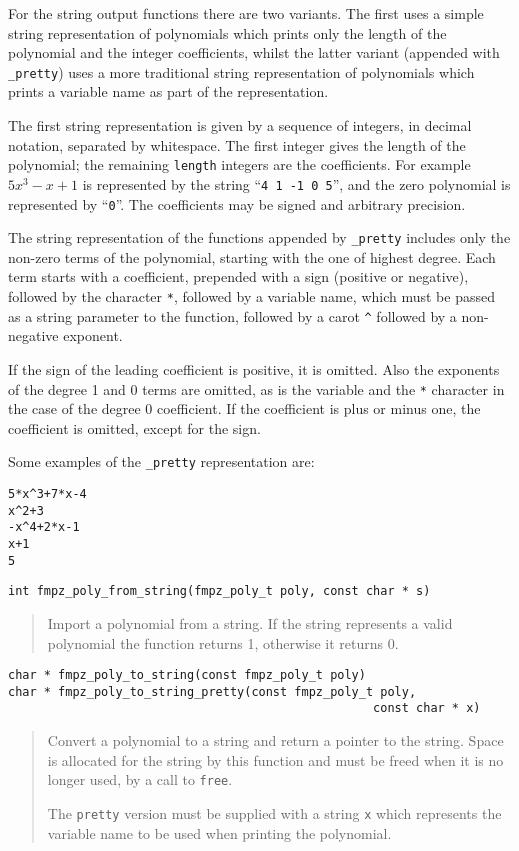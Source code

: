 \documentclass[a4paper,10pt]{article}
\newcommand{\code}{\lstinline}
\begin{document}
For the string output functions there are two variants. The first uses a simple string representation of polynomials which prints only the length of the polynomial and the integer coefficients, whilst the latter variant (appended with \code{_pretty}) uses a more traditional string representation of polynomials which prints a variable name as part of the representation. 

The first string representation is given by a sequence of integers, in decimal notation, separated by whitespace. The first integer gives the length of the polynomial; the remaining \code{length} integers are the coefficients. For example $5x^3 - x + 1$ is represented by the string ``\code{4 1 -1 0 5}'', and the zero polynomial is represented by ``\code{0}''. The coefficients may be signed and arbitrary precision.

The string representation of the functions appended by \code{_pretty} includes only the non-zero terms of the polynomial, starting with the one of highest degree. Each term starts with a coefficient, prepended with a sign (positive or negative), followed by the character \code{*}, followed by a variable name, which must be passed as a string parameter to the function, followed by a carot \code{^} followed by a non-negative exponent.

If the sign of the leading coefficient is positive, it is omitted. Also the exponents of the degree 1 and 0 terms are omitted, as is the variable and the \code{*} character in the case of the degree 0 coefficient. If the coefficient is plus or minus one, the coefficient is omitted, except for the sign.

Some examples of the \code{_pretty} representation are:

\begin{lstlisting}
5*x^3+7*x-4
x^2+3
-x^4+2*x-1
x+1
5
\end{lstlisting}

\begin{lstlisting}
int fmpz_poly_from_string(fmpz_poly_t poly, const char * s)
\end{lstlisting}
\begin{quote}
Import a polynomial from a string. If the string represents a valid polynomial the function returns 1, otherwise it returns 0.
\end{quote}

\begin{lstlisting}
char * fmpz_poly_to_string(const fmpz_poly_t poly)
char * fmpz_poly_to_string_pretty(const fmpz_poly_t poly, 
                                                   const char * x)
\end{lstlisting}
\begin{quote}
Convert a polynomial to a string and return a pointer to the string. Space is allocated for the string by this function and must be freed when it is no longer used, by a call to \code{free}.

The \code{pretty} version must be supplied with a string \code{x} which represents the variable name to be used when printing the polynomial.
\end{quote}
\end{document}
